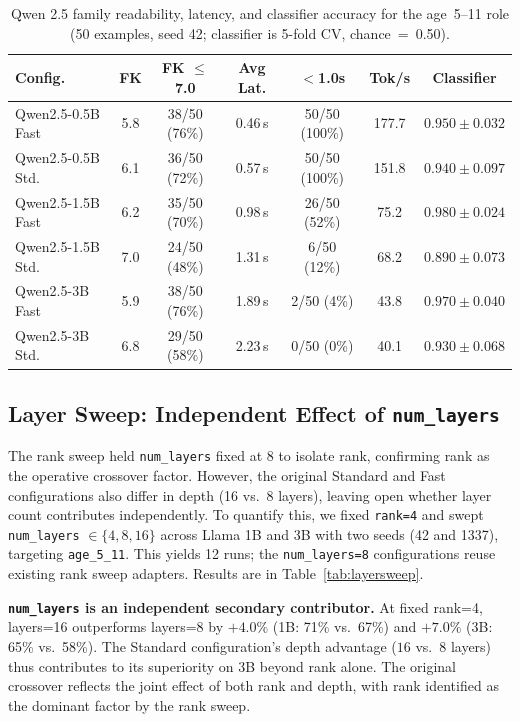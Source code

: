 \documentclass[AMA,Times1COL]{WileyNJDv5} %
\begin{document}
\begin{table}[!t]
  \centering
  \caption{Qwen 2.5 family readability, latency, and classifier accuracy for the age~5--11 role (50 examples, seed 42; classifier is 5-fold CV, chance~=~0.50).}
  \label{tab:qwen25}
  \footnotesize
  \begin{tabular}{lcccccc}
    \hline
    Config. & FK & FK $\leq$7.0 & Avg Lat. & $<$1.0s & Tok/s & Classifier \\
    \hline
    Qwen2.5-0.5B Fast & 5.8 & 38/50 (76\%) & 0.46\,s & 50/50 (100\%) & 177.7 & $0.950 \pm 0.032$ \\
    Qwen2.5-0.5B Std. & 6.1 & 36/50 (72\%) & 0.57\,s & 50/50 (100\%) & 151.8 & $0.940 \pm 0.097$ \\
    Qwen2.5-1.5B Fast & 6.2 & 35/50 (70\%) & 0.98\,s & 26/50 (52\%)  & 75.2  & $\mathbf{0.980 \pm 0.024}$ \\
    Qwen2.5-1.5B Std. & 7.0 & 24/50 (48\%) & 1.31\,s & 6/50 (12\%)   & 68.2  & $0.890 \pm 0.073$ \\
    Qwen2.5-3B Fast   & 5.9 & 38/50 (76\%) & 1.89\,s & 2/50 (4\%)    & 43.8  & $0.970 \pm 0.040$ \\
    Qwen2.5-3B Std.   & 6.8 & 29/50 (58\%) & 2.23\,s & 0/50 (0\%)    & 40.1  & $0.930 \pm 0.068$ \\
    \hline
  \end{tabular}
\end{table}

\subsection{Layer Sweep: Independent Effect of \texttt{num\_layers}}\label{sec:layersweep}

The rank sweep held \texttt{num\_layers} fixed at 8 to isolate rank, confirming rank as the operative crossover factor. However, the original Standard and Fast configurations also differ in depth (16 vs.\ 8 layers), leaving open whether layer count contributes independently. To quantify this, we fixed \texttt{rank=4} and swept \texttt{num\_layers} $\in \{4, 8, 16\}$ across Llama 1B and 3B with two seeds (42 and 1337), targeting \texttt{age\_5\_11}. This yields 12 runs; the \texttt{num\_layers=8} configurations reuse existing rank sweep adapters. Results are in Table~\ref{tab:layersweep}.

\textbf{\texttt{num\_layers} is an independent secondary contributor.} At fixed rank=4, layers=16 outperforms layers=8 by $+4.0\%$ (1B: 71\% vs.\ 67\%) and $+7.0\%$ (3B: 65\% vs.\ 58\%). The Standard configuration's depth advantage ($16$ vs.\ $8$ layers) thus contributes to its superiority on 3B beyond rank alone. The original crossover reflects the joint effect of both rank and depth, with rank identified as the dominant factor by the rank sweep.
\end{document}
